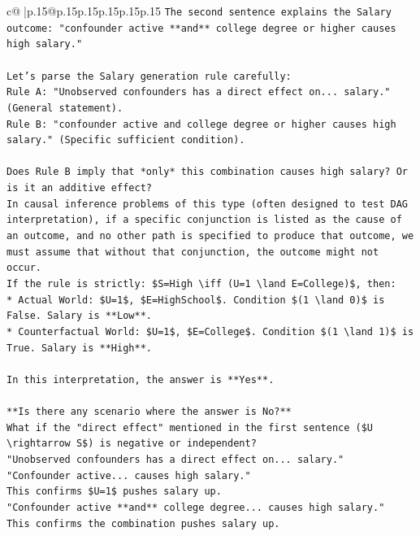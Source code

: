 \documentclass{article}
\begin{document}
{\begin{supertabular}{c@{$\;$}|p{.15\linewidth}@{}p{.15\linewidth}p{.15\linewidth}p{.15\linewidth}p{.15\linewidth}p{.15\linewidth}}
{{{\texttt{The second sentence explains the Salary outcome: "confounder active **and** college degree or higher causes high salary."} \\
\\ 
\texttt{Let's parse the Salary generation rule carefully:} \\
\texttt{Rule A: "Unobserved confounders has a direct effect on... salary." (General statement).} \\
\texttt{Rule B: "confounder active and college degree or higher causes high salary." (Specific sufficient condition).} \\
\\ 
\texttt{Does Rule B imply that *only* this combination causes high salary? Or is it an additive effect?} \\
\texttt{In causal inference problems of this type (often designed to test DAG interpretation), if a specific conjunction is listed as the cause of an outcome, and no other path is specified to produce that outcome, we must assume that without that conjunction, the outcome might not occur.} \\
\texttt{If the rule is strictly: \$S=High \textbackslash{}iff (U=1 \textbackslash{}land E=College)\$, then:} \\
\texttt{*   Actual World: \$U=1\$, \$E=HighSchool\$. Condition \$(1 \textbackslash{}land 0)\$ is False. Salary is **Low**.} \\
\texttt{*   Counterfactual World: \$U=1\$, \$E=College\$. Condition \$(1 \textbackslash{}land 1)\$ is True. Salary is **High**.} \\
\\ 
\texttt{In this interpretation, the answer is **Yes**.} \\
\\ 
\texttt{**Is there any scenario where the answer is No?**} \\
\texttt{What if the "direct effect" mentioned in the first sentence (\$U \textbackslash{}rightarrow S\$) is negative or independent?} \\
\texttt{"Unobserved confounders has a direct effect on... salary."} \\
\texttt{"Confounder active... causes high salary."} \\
\texttt{This confirms \$U=1\$ pushes salary up.} \\
\texttt{"Confounder active **and** college degree... causes high salary."} \\
\texttt{This confirms the combination pushes salary up.} \\
}}}
\end{supertabular}}
\end{document}
